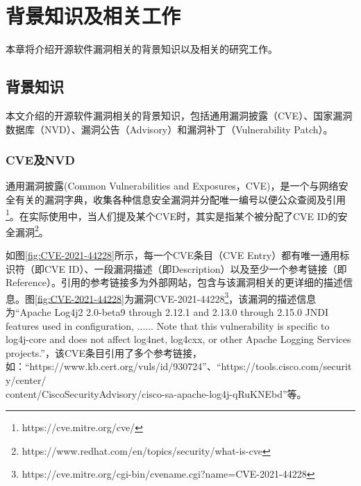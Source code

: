 \chapter{背景知识及相关工作}
本章将介绍开源软件漏洞相关的背景知识以及相关的研究工作。


\section{背景知识}
本文介绍的开源软件漏洞相关的背景知识，包括通用漏洞披露（CVE）、国家漏洞数据库（NVD）、漏洞公告（Advisory）和漏洞补丁（Vulnerability Patch）。

\subsection{CVE及NVD} 
通用漏洞披露(Common Vulnerabilities and Exposures，CVE)\cite{mitre2021:cve}，是一个与网络安全有关的漏洞字典，收集各种信息安全漏洞并分配唯一编号以便公众查阅及引用\footnote{https://cve.mitre.org/cve/}。在实际使用中，当人们提及某个CVE时，其实是指某个被分配了CVE ID的安全漏洞\footnote{https://www.redhat.com/en/topics/security/what-is-cve}。

如图\ref{fig:CVE-2021-44228}所示，每一个CVE条目（CVE Entry）都有唯一通用标识符（即CVE ID）、一段漏洞描述（即Description）以及至少一个参考链接（即Reference）。引用的参考链接多为外部网站，包含与该漏洞相关的更详细的描述信息。图\ref{fig:CVE-2021-44228}为漏洞CVE-2021-44228\footnote{https://cve.mitre.org/cgi-bin/cvename.cgi?name=CVE-2021-44228}，该漏洞的描述信息为“Apache Log4j2 2.0-beta9 through 2.12.1 and 2.13.0 through 2.15.0 JNDI features used in configuration, ...... Note that this vulnerability is specific to log4j-core and does not affect log4net, log4cxx, or other Apache Logging Services projects.”，该CVE条目引用了多个参考链接，如：“https://www.kb.cert.org/vuls/id/930724”、“https://tools.cisco.com/security/center/\\content/CiscoSecurityAdvisory/cisco-sa-apache-log4j-qRuKNEbd”等。

